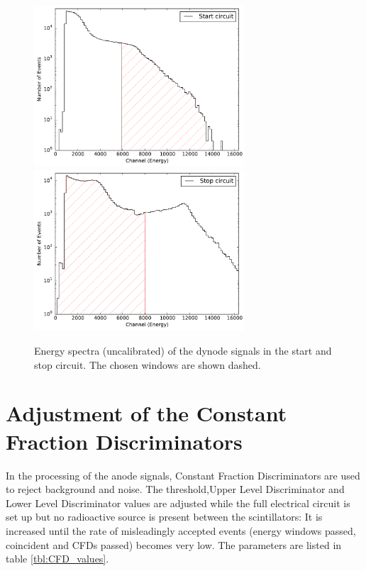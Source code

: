 \documentclass[
	paper=A4,
	parskip=full,
	chapterprefix=true,
	11pt,
	headings=normal,
	bibliography=totoc,
	listof=totoc,
	titlepage=on,
]{scrreprt}
\begin{document}
\begin{figure}[h]
	\centering
	\includegraphics[width=0.7\textwidth]{windows_0}
	\includegraphics[width=0.7\textwidth]{windows_1}
	\caption{Energy spectra (uncalibrated) of the dynode signals in the start and stop circuit. The chosen windows are shown dashed.}
	\label{fig:WD_spectra}
\end{figure}



\FloatBarrier
\section{Adjustment of the Constant Fraction Discriminators}

In the processing of the anode signals, Constant Fraction Discriminators are used to reject background and noise. The threshold,Upper Level Discriminator and Lower Level Discriminator values are adjusted while the full electrical circuit is set up but no radioactive source is present between the scintillators: It is increased until the rate of misleadingly accepted events (energy windows passed, coincident and CFDs passed) becomes very low. The parameters are listed in table \ref{tbl:CFD_values}.
\end{document}
